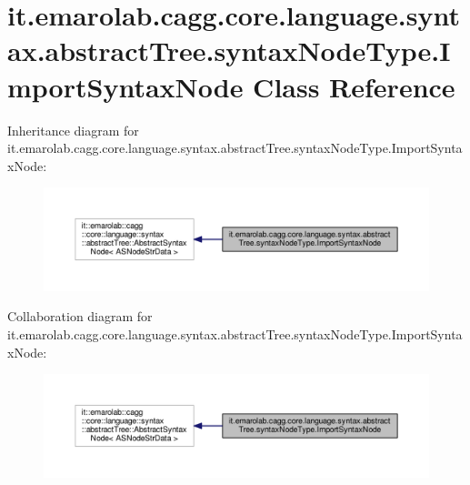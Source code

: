 \hypertarget{classit_1_1emarolab_1_1cagg_1_1core_1_1language_1_1syntax_1_1abstractTree_1_1syntaxNodeType_1_1ImportSyntaxNode}{\section{it.\-emarolab.\-cagg.\-core.\-language.\-syntax.\-abstract\-Tree.\-syntax\-Node\-Type.\-Import\-Syntax\-Node Class Reference}
\label{classit_1_1emarolab_1_1cagg_1_1core_1_1language_1_1syntax_1_1abstractTree_1_1syntaxNodeType_1_1ImportSyntaxNode}
}


Inheritance diagram for it.\-emarolab.\-cagg.\-core.\-language.\-syntax.\-abstract\-Tree.\-syntax\-Node\-Type.\-Import\-Syntax\-Node\-:\nopagebreak
\begin{figure}[H]
\begin{center}
\leavevmode
\includegraphics[width=350pt]{classit_1_1emarolab_1_1cagg_1_1core_1_1language_1_1syntax_1_1abstractTree_1_1syntaxNodeType_1_1ImportSyntaxNode__inherit__graph}
\end{center}
\end{figure}


Collaboration diagram for it.\-emarolab.\-cagg.\-core.\-language.\-syntax.\-abstract\-Tree.\-syntax\-Node\-Type.\-Import\-Syntax\-Node\-:\nopagebreak
\begin{figure}[H]
\begin{center}
\leavevmode
\includegraphics[width=350pt]{classit_1_1emarolab_1_1cagg_1_1core_1_1language_1_1syntax_1_1abstractTree_1_1syntaxNodeType_1_1ImportSyntaxNode__coll__graph}
\end{center}
\end{figure}
